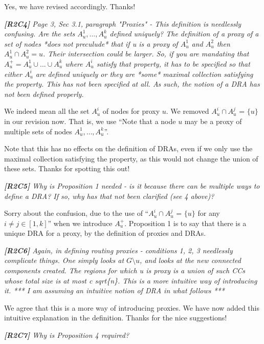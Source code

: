 \documentclass[11pt]{letter}
\newcommand{\vs}{\vspace{1ex}}
\newcommand{\svs}{\vspace{0.36ex}}
\begin{document}
Yes, we have revised accordingly. Thanks!


\vs
\noindent
{\em{\bf[R2C4]} Page 3, Sec 3.1, paragraph "Proxies" - This definition is needlessly confusing. Are the sets $A_u^1, ..., A_u^k$ defined uniquely? The definition of a proxy of a set of nodes *does not preculude* that
if u is a proxy of $A_u^1$ and $A_u^2$ then $A_u^1 \cap A_u^2 = {u}$.
Their intersection could be larger. So, if you are mandating that
$A_u^+ = A_u^1 \cup ... \cup A_u^k$ where $A_u^i$ satisfy that property,
it has to be specified so that either $A_u^i$ are defined uniquely or
they are *some* maximal collection satisfying the property. This
has not been specified at all. As such, the notion of a DRA has
not been defined properly.}
\svs

We indeed mean all the set $A_u^i$ of nodes for proxy $u$. We removed $A^i_u\cap A^j_u$ = $\{u\}$ in our revision now.
%
That is, we use ``Note that a node $u$ may be a proxy of multiple sets of nodes $A^1_u, \ldots, A^k_u$''.

Note that this has no effects on the definition of DRAs, even if we only use the maximal collection satisfying the property, as this would not change the union of these sets. Thanks for spotting this out!

\vs
\noindent
{\em{\bf[R2C5]} Why is Proposition 1 needed - is it because there can be multiple ways to define a DRA? If so, why has that not been clarified (see 4 above)?}
\svs

Sorry about the confusion, due to the use of ``$A^i_u\cap A^j_u$ = $\{u\}$ for any $i\ne j\in[1, k]$'' when we introduce $A_u^+$.
 Proposition 1 is to say that there is a unique DRA for a proxy, by the definition of proxies and DRAs.


\vs
\noindent
{\em{\bf[R2C6]} Again, in defining routing proxies - conditions 1, 2, 3 needlessly
complicate things. One simply looks at $G \setminus u$, and looks at the
new connected components created. The regions for which u is proxy
is a union of such CCs whose total size is at most c sqrt\{n\}. This
is a more intuitive way of introducing it.
*** I am assuming an intuitive notion of DRA in what follows ***
}
\svs

We agree that this is a more  way of introducing proxies.  We have now added this intuitive explanation in the definition. Thanks for the nice suggestions!



\vs
\noindent
{\em{\bf[R2C7]} Why is Proposition 4 required?}
\svs
\end{document}
